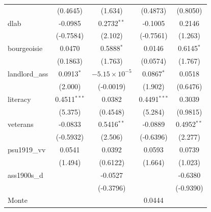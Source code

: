 \begin{table}[htbp]
\begin{tabular}{lcccc}
                                       & (0.4645)               & (1.634)                & (0.4873)               & (0.8050)\\   
      dlab                             & -0.0985                & 0.2732$^{**}$          & -0.1005                & 0.2146\\   
                                       & (-0.7584)              & (2.102)                & (-0.7561)              & (1.263)\\   
      bourgeoisie                      & 0.0470                 & 0.5888$^{*}$           & 0.0146                 & 0.6145$^{*}$\\   
                                       & (0.1863)               & (1.763)                & (0.0574)               & (1.767)\\   
      landlord\_ass                    & 0.0913$^{*}$           & $-5.15\times 10^{-5}$  & 0.0867$^{*}$           & 0.0518\\   
                                       & (2.000)                & (-0.0019)              & (1.902)                & (0.6476)\\   
      literacy                         & 0.4511$^{***}$         & 0.0382                 & 0.4491$^{***}$         & 0.3039\\   
                                       & (5.375)                & (0.4548)               & (5.284)                & (0.9815)\\   
      veterans                         & -0.0833                & 0.5416$^{**}$          & -0.0889                & 0.4952$^{**}$\\   
                                       & (-0.5932)              & (2.506)                & (-0.6396)              & (2.277)\\   
      psu1919\_vv                      & 0.0541                 & 0.0392                 & 0.0593                 & 0.0739\\   
                                       & (1.494)                & (0.6122)               & (1.664)                & (1.023)\\   
      ass1900s\_d                      &                        & -0.0527                &                        & -0.6380\\   
                                       &                        & (-0.3796)              &                        & (-0.9390)\\   
      Monte                            &                        &                        & 0.0444                 &   \\   

\end{tabular}
\end{table}
